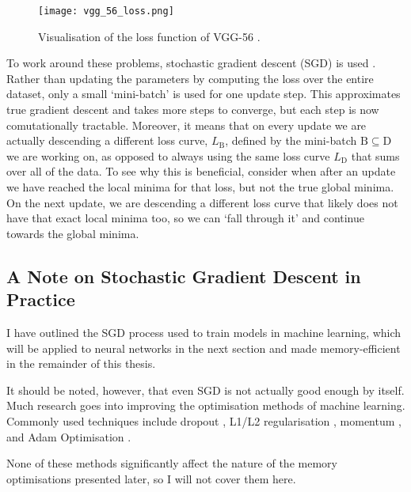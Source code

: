 \begin{figure}[htb]
    \centering
    \texttt{[image: vgg\_56\_loss.png]}
    \caption{Visualisation of the loss function of VGG-56 \cite{Li2018}.}
    \label{fig:2-vgg-loss}
\end{figure}

To work around these problems, stochastic gradient descent (SGD) is used \cite{Bottou2018}. Rather than updating the parameters by computing the loss over the entire dataset, only a small `mini-batch' is used for one update step. This approximates true gradient descent and takes more steps to converge, but each step is now comutationally tractable. Moreover, it means that on every update we are actually descending a different loss curve, \(L_\mathrm{B}\), defined by the mini-batch \(\mathrm{B}\subseteq \mathrm{D}\) we are working on, as opposed to always using the same loss curve \(L_\mathrm{D}\) that sums over all of the data. To see why this is beneficial, consider when after an update we have reached the local minima for that loss, but not the true global minima. On the next update, we are descending a different loss curve that likely does not have that exact local minima too, so we can ‘fall through it’ and continue towards the global minima.

\subsection*{A Note on Stochastic Gradient Descent in Practice}
I have outlined the SGD process used to train models in machine learning, which will be applied to neural networks in the next section and made memory-efficient in the remainder of this thesis.

It should be noted, however, that even SGD is not actually good enough by itself.
Much research goes into improving the optimisation methods of machine learning.
Commonly used techniques include dropout \cite{Srivastava2014}, L1/L2 regularisation \cite{Anders1992-weight-decay, Ng2004}, momentum \cite{Sutskever2013}, and Adam Optimisation \cite{Kingma2015-adam}.

None of these methods significantly affect the nature of the memory optimisations presented later, so I will not cover them here.

